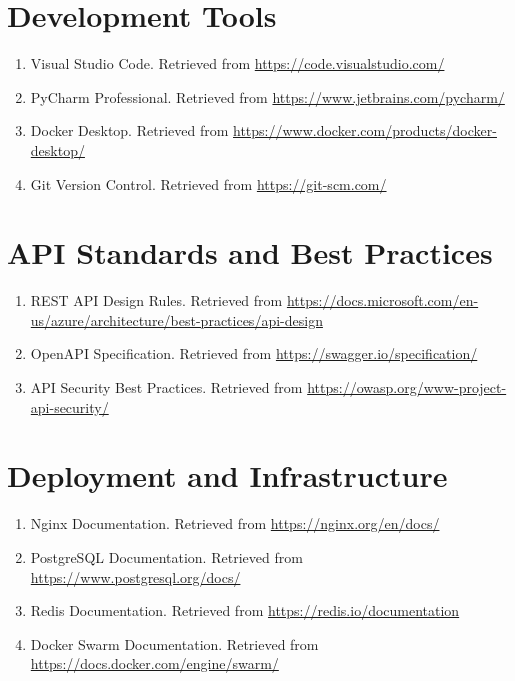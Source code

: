 \documentclass[12pt,a4paper]{report}
\begin{document}
\section{Development Tools}
\begin{enumerate}
    \item Visual Studio Code. Retrieved from \url{https://code.visualstudio.com/}
    
    \item PyCharm Professional. Retrieved from \url{https://www.jetbrains.com/pycharm/}
    
    \item Docker Desktop. Retrieved from \url{https://www.docker.com/products/docker-desktop/}
    
    \item Git Version Control. Retrieved from \url{https://git-scm.com/}
\end{enumerate}

\section{API Standards and Best Practices}
\begin{enumerate}
    \item REST API Design Rules. Retrieved from \url{https://docs.microsoft.com/en-us/azure/architecture/best-practices/api-design}
    
    \item OpenAPI Specification. Retrieved from \url{https://swagger.io/specification/}
    
    \item API Security Best Practices. Retrieved from \url{https://owasp.org/www-project-api-security/}
\end{enumerate}

\section{Deployment and Infrastructure}
\begin{enumerate}
    \item Nginx Documentation. Retrieved from \url{https://nginx.org/en/docs/}
    
    \item PostgreSQL Documentation. Retrieved from \url{https://www.postgresql.org/docs/}
    
    \item Redis Documentation. Retrieved from \url{https://redis.io/documentation}
    
    \item Docker Swarm Documentation. Retrieved from \url{https://docs.docker.com/engine/swarm/}
\end{enumerate}
\end{document}
